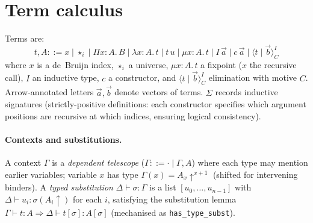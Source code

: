 \section{Term calculus}
\label{sec:calculus}

Terms are:
\[
t,A ::= x \mid \star_i \mid \Pi x{:}A.\,B \mid \lambda x{:}A.\,t \mid t\,u \mid \mu x{:}A.\,t \mid I\,\vec{a} \mid c\,\vec{a} \mid \langle t \mid \vec{b} \rangle^I_C
\]
where $x$ is a de~Bruijn index, $\star_i$ a universe, $\mu x{:}A.\,t$ a
fixpoint ($x$ the recursive call), $I$ an inductive type, $c$ a constructor,
and $\langle t \mid \vec{b} \rangle^I_C$ elimination with motive $C$.
Arrow-annotated letters $\vec{a},\vec{b}$ denote vectors of terms.
$\Sigma$ records inductive signatures (strictly-positive definitions:
each constructor specifies which argument positions are recursive at which
indices, ensuring logical consistency).

\paragraph{Contexts and substitutions.}
A context $\Gamma$ is a \emph{dependent telescope}
($\Gamma ::= \cdot \mid \Gamma,A$) where each type may mention earlier
variables; variable $x$ has type $\Gamma(x)=A_x\uparrow^{x+1}$ (shifted for
intervening binders).  A \emph{typed substitution}
$\Delta\vdash\sigma:\Gamma$ is a list $[u_0,\dots,u_{n-1}]$ with
$\Delta\vdash u_i:\sigma(A_i{\uparrow})$ for each $i$, satisfying the
substitution lemma $\Gamma\vdash t:A \Rightarrow \Delta\vdash
t[\sigma]:A[\sigma]$ (mechanised as \texttt{has\_type\_subst}).


